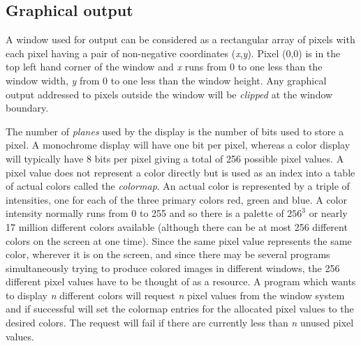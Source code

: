\subsection{Graphical output}
A window used for output can be considered as
a rectangular array of pixels with each pixel having a pair of
non-negative coordinates ({\em x},{\em y}).
Pixel (0,0) is in the top left hand corner of the window and {\em x} runs
from 0 to one less than the window width, {\em y} from 0 to one less than
the window height. Any graphical output addressed to pixels outside the
window will be {\em clipped} at the window boundary.

The number of {\em planes} used by the display is the number of bits used
to store a pixel.
A monochrome display will have one bit per pixel, whereas a color display
will typically have 8 bits per pixel giving a total of 256 possible pixel
values.
A pixel value does not represent a color directly but is used as an index
into a table of actual colors called the {\em colormap}.
An actual color is represented by a
triple of intensities, one for each of the three primary colors red, green and blue.
A color intensity normally runs from 0 to 255 and so there is a palette of $256^{3}$
or nearly 17 million different colors available (although there can be at
most 256 different colors on the screen at one time).
Since the same pixel value represents the same color, wherever it is on the
screen, and since there may be several programs simultaneously trying
to produce colored images in different windows,
the 256 different pixel values have to be thought of as a resource.
A program which wants to display {\em n} different colors will
request {\em n} pixel values from the window system and if successful will
set the colormap entries for the allocated pixel values to the desired colors.
The request will fail if there are currently less than {\em n} unused pixel values.
